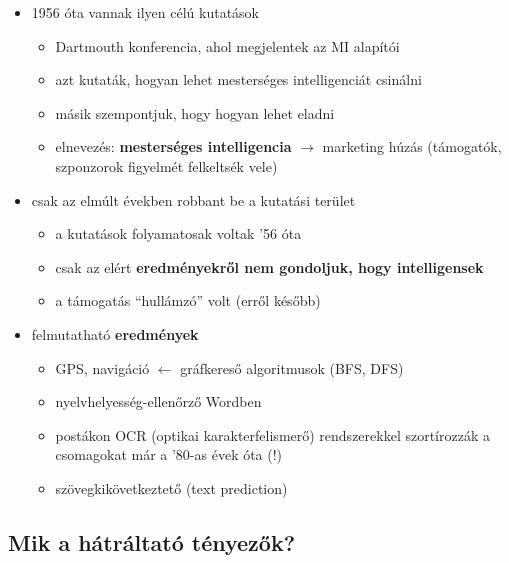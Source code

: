 \documentclass[a4paper, 11pt]{article}
\begin{document}
\begin{itemize}
	\item 1956 óta vannak ilyen célú kutatások
	\begin{itemize}
		\item Dartmouth konferencia, ahol megjelentek az MI alapítói
		\item azt kutaták, hogyan lehet mesterséges intelligenciát csinálni
		\item másik szempontjuk, hogy hogyan lehet eladni
		\item elnevezés: \textbf{mesterséges intelligencia} $\to$ marketing húzás (támogatók, szponzorok figyelmét felkeltsék vele)
	\end{itemize}
\item csak az elmúlt években robbant be a kutatási terület
\begin{itemize}
	\item a kutatások folyamatosak voltak '56 óta
	\item csak az elért \textbf{eredményekről nem gondoljuk, hogy intelligensek}
	\item a támogatás ``hullámzó'' volt (erről később)
\end{itemize}
\item felmutatható \textbf{eredmények}
\begin{itemize}
	\item GPS, navigáció $\leftarrow$ gráfkereső algoritmusok (BFS, DFS)
	\item nyelvhelyesség-ellenőrző Wordben
	\item postákon OCR (optikai karakterfelismerő) rendszerekkel szortírozzák a csomagokat már a '80-as évek óta (!)
	\item szövegkikövetkeztető (text prediction)
\end{itemize}
\end{itemize}

\subsection{Mik a hátráltató tényezők?}
\end{document}
